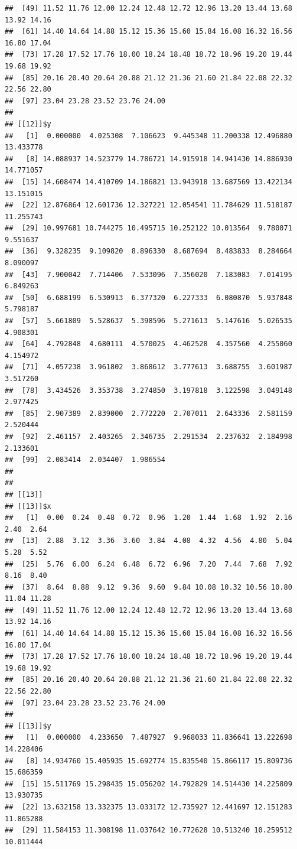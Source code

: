 \documentclass[
  ignorenonframetext,
]{beamer}
\begin{document}
\begin{frame}[fragile]{}
\begin{verbatim}
##  [49] 11.52 11.76 12.00 12.24 12.48 12.72 12.96 13.20 13.44 13.68 13.92 14.16
##  [61] 14.40 14.64 14.88 15.12 15.36 15.60 15.84 16.08 16.32 16.56 16.80 17.04
##  [73] 17.28 17.52 17.76 18.00 18.24 18.48 18.72 18.96 19.20 19.44 19.68 19.92
##  [85] 20.16 20.40 20.64 20.88 21.12 21.36 21.60 21.84 22.08 22.32 22.56 22.80
##  [97] 23.04 23.28 23.52 23.76 24.00
## 
## [[12]]$y
##   [1]  0.000000  4.025308  7.106623  9.445348 11.200338 12.496880 13.433778
##   [8] 14.088937 14.523779 14.786721 14.915918 14.941430 14.886930 14.771057
##  [15] 14.608474 14.410709 14.186821 13.943918 13.687569 13.422134 13.151015
##  [22] 12.876864 12.601736 12.327221 12.054541 11.784629 11.518187 11.255743
##  [29] 10.997681 10.744275 10.495715 10.252122 10.013564  9.780071  9.551637
##  [36]  9.328235  9.109820  8.896330  8.687694  8.483833  8.284664  8.090097
##  [43]  7.900042  7.714406  7.533096  7.356020  7.183083  7.014195  6.849263
##  [50]  6.688199  6.530913  6.377320  6.227333  6.080870  5.937848  5.798187
##  [57]  5.661809  5.528637  5.398596  5.271613  5.147616  5.026535  4.908301
##  [64]  4.792848  4.680111  4.570025  4.462528  4.357560  4.255060  4.154972
##  [71]  4.057238  3.961802  3.868612  3.777613  3.688755  3.601987  3.517260
##  [78]  3.434526  3.353738  3.274850  3.197818  3.122598  3.049148  2.977425
##  [85]  2.907389  2.839000  2.772220  2.707011  2.643336  2.581159  2.520444
##  [92]  2.461157  2.403265  2.346735  2.291534  2.237632  2.184998  2.133601
##  [99]  2.083414  2.034407  1.986554
## 
## 
## [[13]]
## [[13]]$x
##   [1]  0.00  0.24  0.48  0.72  0.96  1.20  1.44  1.68  1.92  2.16  2.40  2.64
##  [13]  2.88  3.12  3.36  3.60  3.84  4.08  4.32  4.56  4.80  5.04  5.28  5.52
##  [25]  5.76  6.00  6.24  6.48  6.72  6.96  7.20  7.44  7.68  7.92  8.16  8.40
##  [37]  8.64  8.88  9.12  9.36  9.60  9.84 10.08 10.32 10.56 10.80 11.04 11.28
##  [49] 11.52 11.76 12.00 12.24 12.48 12.72 12.96 13.20 13.44 13.68 13.92 14.16
##  [61] 14.40 14.64 14.88 15.12 15.36 15.60 15.84 16.08 16.32 16.56 16.80 17.04
##  [73] 17.28 17.52 17.76 18.00 18.24 18.48 18.72 18.96 19.20 19.44 19.68 19.92
##  [85] 20.16 20.40 20.64 20.88 21.12 21.36 21.60 21.84 22.08 22.32 22.56 22.80
##  [97] 23.04 23.28 23.52 23.76 24.00
## 
## [[13]]$y
##   [1]  0.000000  4.233650  7.487927  9.968033 11.836641 13.222698 14.228406
##   [8] 14.934760 15.405935 15.692774 15.835540 15.866117 15.809736 15.686359
##  [15] 15.511769 15.298435 15.056202 14.792829 14.514430 14.225809 13.930735
##  [22] 13.632158 13.332375 13.033172 12.735927 12.441697 12.151283 11.865288
##  [29] 11.584153 11.308198 11.037642 10.772628 10.513240 10.259512 10.011444

\end{verbatim}
\end{frame}
\end{document}
